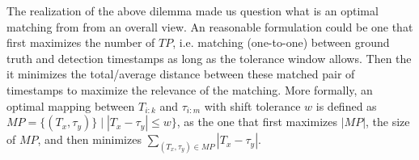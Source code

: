 The realization of the above dilemma made us question what is an optimal matching from from an overall view.
An reasonable formulation could be one that first maximizes the number of $TP$, i.e. matching (one-to-one) between ground truth and detection timestamps as long as the tolerance window allows.
Then the it minimizes the total/average distance between these matched pair of timestamps to maximize the relevance of the matching.
More formally, an optimal mapping between $T_{i:k}$ and $\tau_{i:m}$ with shift tolerance $w$ is defined as $MP = \{(T_x, \tau_y)\} \mid |T_x - \tau_y| \leq w \}$, as the one that first maximizes $|MP|$, the size of $MP$, and then minimizes $\sum_{(T_x, \tau_y) \in MP} |T_x - \tau_y|$. 




